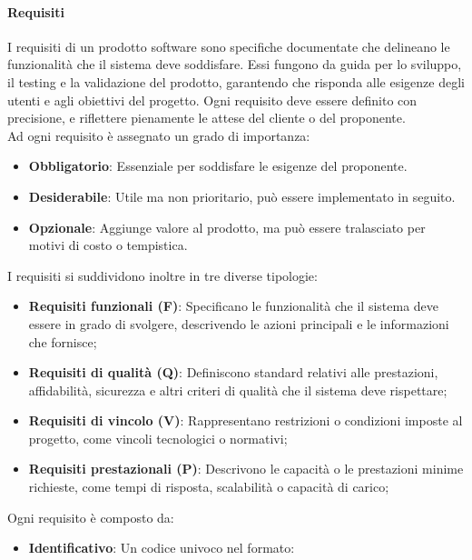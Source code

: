 \documentclass[10pt]{article}
\begin{document}
\begin{justify}
        \paragraph{Requisiti}
        I requisiti di un prodotto software sono specifiche documentate che delineano le funzionalità che il sistema deve soddisfare. Essi fungono da guida per lo sviluppo, il testing e la validazione del prodotto, garantendo che risponda alle esigenze degli utenti e agli obiettivi del progetto. Ogni requisito deve essere definito con precisione, e riflettere pienamente le attese del cliente o del proponente.\\
        Ad ogni requisito è assegnato un grado di importanza:
        \begin{itemize}
            \item \textbf{Obbligatorio}: Essenziale per soddisfare le esigenze del proponente.
            \item \textbf{Desiderabile}: Utile ma non prioritario, può essere implementato in seguito.
            \item \textbf{Opzionale}: Aggiunge valore al prodotto, ma può essere tralasciato per motivi di costo o tempistica.
        \end{itemize}
        I requisiti si suddividono inoltre in tre diverse tipologie:
        \begin{itemize}
            \item \textbf{Requisiti funzionali (F)}: Specificano le funzionalità che il sistema deve essere in grado di svolgere, descrivendo le azioni principali e le informazioni che fornisce;
            \item \textbf{Requisiti di qualità (Q)}: Definiscono standard relativi alle prestazioni, affidabilità, sicurezza e altri criteri di qualità che il sistema deve rispettare;
            \item \textbf{Requisiti di vincolo (V)}: Rappresentano restrizioni o condizioni imposte al progetto, come vincoli tecnologici o normativi;
            \item \textbf{Requisiti prestazionali (P)}: Descrivono le capacità o le prestazioni minime richieste, come tempi di risposta, scalabilità o capacità di carico;
        \end{itemize}
        Ogni requisito è composto da:
        \begin{itemize}
            \item \textbf{Identificativo}: Un codice univoco nel formato:
            \begin{quote}

\end{quote}
\end{itemize}
\end{justify}
\end{document}
